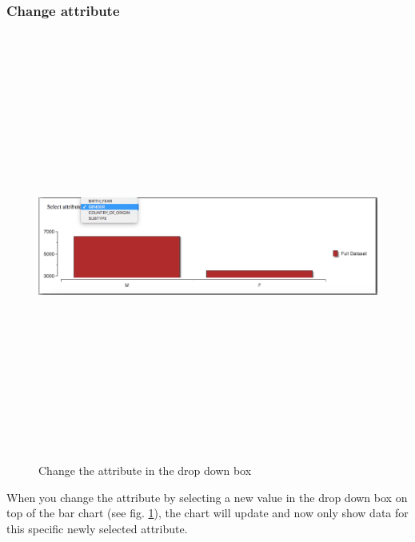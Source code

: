 \documentclass[a4paper, 11pt]{article} %
\begin{document}
\subsubsection{Change attribute}
\begin{figure}[H]
\centering
\includegraphics[width=400pt, height=400pt, keepaspectratio=true]{images/change_attr.PNG}
\caption{Change the attribute in the drop down box}
\label{fig:change_attr}
\end{figure}
When you change the attribute by selecting a new value in the drop down box on top of the bar chart (see fig. \ref{fig:change_attr}), the chart will update and now only show data for this specific newly selected attribute.
\end{document}
